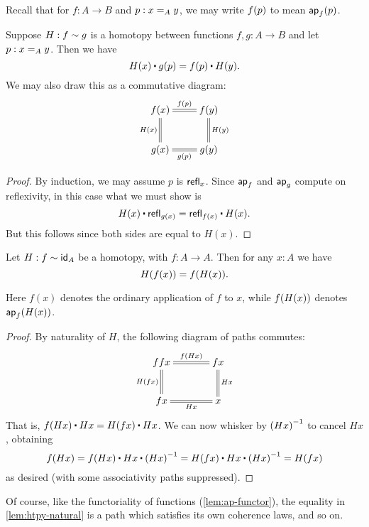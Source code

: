 Recall that for $f:A\to B$ and $p:\id[A]xy$, we may write $\ap f p$ to mean $\apfunc{f} (p)$.

\begin{lem}\label{lem:htpy-natural}
  Suppose $H:f\htpy g$ is a homotopy between functions $f,g:A\to B$ and let $p:\id[A]xy$.  Then we have
  \begin{equation*}
    H(x)\ct\ap{g}{p}=\ap{f}{p}\ct H(y).
  \end{equation*}
  We may also draw this as a commutative diagram:
  \begin{align*}
    \xymatrix{
      f(x) \ar@{=}[r]^{\ap fp} \ar@{=}[d]_{H(x)} & f(y) \ar@{=}[d]^{H(y)} \\
      g(x) \ar@{=}[r]_{\ap gp} & g(y)
    }
  \end{align*}
\end{lem}
\begin{proof}
  By induction, we may assume $p$ is $\refl x$.
  Since $\apfunc{f}$ and $\apfunc g$ compute on reflexivity, in this case what we must show is
  \[ H(x) \ct \refl{g(x)} = \refl{f(x)} \ct H(x). \]
  But this follows since both sides are equal to $H(x)$.
\end{proof}

\begin{cor}\label{cor:hom-fg}
  Let $H : f \htpy \idfunc[A]$ be a homotopy, with $f : A \to A$. Then for any $x : A$ we have \[ H(f(x)) = \ap f{H(x)}. \]
\end{cor}
\noindent
Here $f(x)$ denotes the ordinary application of $f$ to $x$, while $\ap f{H(x)}$ denotes $\apfunc{f}(H(x))$.
\begin{proof}
By naturality of $H$, the following diagram of paths commutes:
\begin{align*}
\xymatrix@C=3pc{
ffx \ar@{=}[r]^-{\ap f{Hx}} \ar@{=}[d]_{H(fx)} & fx \ar@{=}[d]^{Hx} \\
fx \ar@{=}[r]_-{Hx} & x
}
\end{align*}
That is, $\ap f{H x} \ct H x = H(f x) \ct H x$.
We can now whisker by $\opp{(H x)}$ to cancel $H x$, obtaining
\[ \ap f{H x}
= \ap f{H x} \ct H x \ct \opp{(H x)}
= H(f x) \ct H x \ct \opp{(H x)}
= H(f x)
\]
as desired (with some associativity paths suppressed).
\end{proof}

Of course, like the functoriality of functions (\cref{lem:ap-functor}), the equality in \cref{lem:htpy-natural} is a path which satisfies its own coherence laws, and so on.

